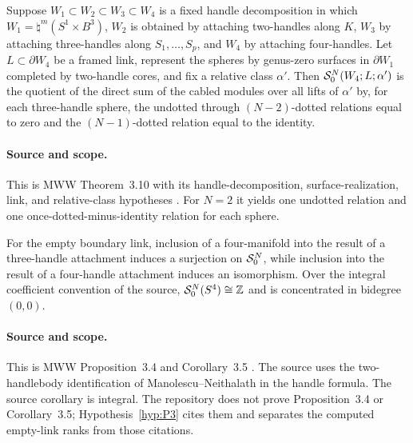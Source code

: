\begin{externalresult}\label{prop:mww-3.10}
Suppose
$W_1\subset W_2\subset W_3\subset W_4$ is a fixed handle decomposition in
which $W_1=\natural^m(S^1\times B^3)$, $W_2$ is obtained by attaching
two-handles along $K$, $W_3$ by attaching three-handles along
$S_1,\ldots,S_p$, and $W_4$ by attaching four-handles.  Let
$L\subset\partial W_4$ be a framed link, represent the spheres by genus-zero
surfaces in $\partial W_1$ completed by two-handle cores, and fix a relative
class $\alpha'$.  Then $\mathcal{S}^{N}_{0}(W_4;L;\alpha')$ is the quotient of the
direct sum of the cabled modules over all lifts of $\alpha'$ by, for each
three-handle sphere, the undotted through $(N-2)$-dotted relations equal to
zero and the $(N-1)$-dotted relation equal to the identity.
\end{externalresult}

\paragraph{Source and scope.}
This is MWW Theorem~3.10 with its handle-decomposition, surface-realization,
link, and relative-class hypotheses
\cite[Theorem~3.10]{ManolescuWalkerWedrich2023}.
For $N=2$ it yields one undotted relation and one once-dotted-minus-identity
relation for each sphere.

\begin{externalresult}\label{prop:mww-3.4}
For the empty boundary link, inclusion of a four-manifold into the result of a
three-handle attachment induces a surjection on $\mathcal{S}^{N}_{0}$, while inclusion
into the result of a four-handle attachment induces an isomorphism.  Over the
integral coefficient convention of the source,
$\mathcal{S}^{N}_{0}(S^4)\cong\mathbb{Z}$ and is concentrated in bidegree $(0,0)$.
\end{externalresult}

\paragraph{Source and scope.}
This is MWW Proposition~3.4 and Corollary~3.5
\cite[Proposition~3.4 and Corollary~3.5]{ManolescuWalkerWedrich2023}.
The source uses the two-handlebody identification of
Manolescu--Neithalath \cite{ManolescuNeithalath2020} in the handle formula.
The source corollary is integral.  The repository does not prove
Proposition~3.4 or Corollary~3.5; Hypothesis~\ref{hyp:P3} cites them and
separates the computed empty-link ranks from those citations.

